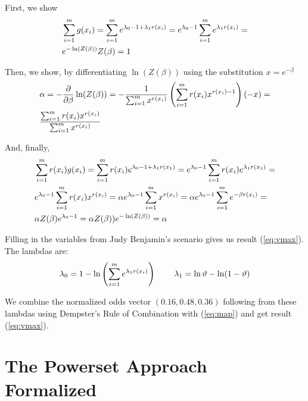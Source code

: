 \documentclass[12pt]{article}
\begin{document}
First, we show
\begin{align}
&\sum_{i=1}^{m}g(x_{i})=\sum_{i=1}^{m}e^{\lambda_{0}-1+\lambda_{1}r(x_{i})}=e^{\lambda_{0}-1}\sum_{i=1}^{m}e^{\lambda_{1}r(x_{i})}=\notag\\
&e^{-\ln(Z(\beta))}Z(\beta)=1\label{eq:unishow}\notag
\end{align}

Then, we show, by differentiating $\ln(Z(\beta))$ using the
substitution $x=e^{-\beta}$
\begin{align}
&\alpha=-\frac{\partial}{\partial{}\beta}\ln(Z(\beta))=-\frac{1}{\sum_{i=1}^{m}x^{r(x_{i})}}\left(\sum_{i=1}^{m}r(x_{i})x^{r(x_{i})-1}\right)(-x)=\notag\\
&\frac{\sum_{i=1}^{m}r(x_{i})x^{r(x_{i})}}{\sum_{i=1}^{m}x^{r(x_{i})}}\notag
\end{align}

And, finally,
\begin{align}
&\sum_{i=1}^{m}r(x_{i})g(x_{i})=\sum_{i=1}^{m}r(x_{i})e^{\lambda_{0}-1+\lambda_{1}r(x_{1})}=e^{\lambda_{0}-1}\sum_{i=1}^{m}r(x_{i})e^{\lambda_{1}r(x_{1})}=\notag\\
&e^{\lambda_{0}-1}\sum_{i=1}^{m}r(x_{i})x^{r(x_{i})}=\alpha{}e^{\lambda_{0}-1}\sum_{i=1}^{m}x^{r(x_{i})}=\alpha{}e^{\lambda_{0}-1}\sum_{i=1}^{m}e^{-\beta{}r(x_{i})}=\notag\\
&\alpha{}Z(\beta)e^{\lambda_{0}-1}=\alpha{}Z(\beta))e^{-\ln(Z(\beta))}=\alpha\notag
\end{align}

Filling in the variables from Judy Benjamin's scenario gives us result
({\ref{eq:vmax}}). The lambdas are:
  \begin{displaymath}
    \lambda_{0}=1-\ln\left(\sum_{i=1}^{m}e^{\lambda_{1}r(x_{i})}\right)\hspace{.3in}
    \lambda_{1}=\ln{}{\vartheta}-\ln(1-{\vartheta})\notag
  \end{displaymath}

  We combine the normalized odds vector $(0.16,0.48,0.36)$ following
  from these lambdas using Dempster's Rule of Combination with
  ({\ref{eq:map}}) and get result ({\ref{eq:vmax}}).

\section{The Powerset Approach Formalized}
\label{ThePowersetApproachFormalized}
\end{document}
